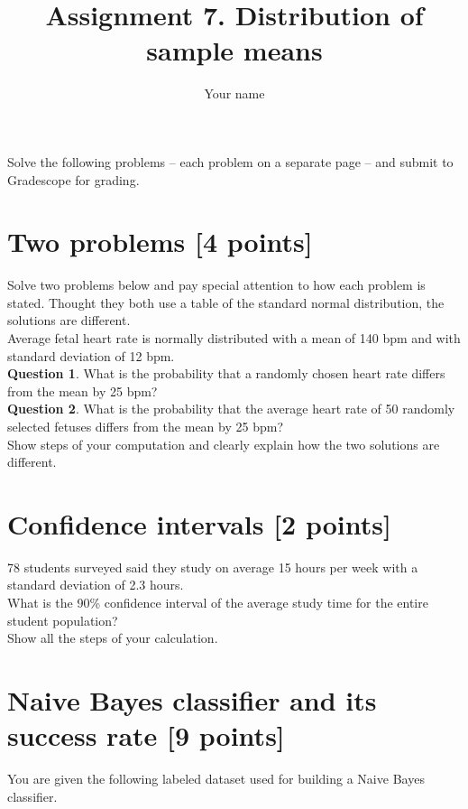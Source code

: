 \documentclass{article}
\title{Assignment 7. Distribution of sample means}
\author{Your name}
\begin{document}
\maketitle


Solve the following problems -- each problem on a separate page -- and submit to Gradescope for grading. 

\newpage
\section{Two problems [4 points]}
Solve two problems below and pay special attention to how each problem is stated. Thought they both use a table of the standard normal distribution, the solutions are different.\\

Average fetal heart rate is normally distributed with a mean of 140 bpm and with standard deviation of 12 bpm.\\ 

{\bf Question 1}. What is the probability that a randomly chosen heart rate differs from the mean by 25 bpm?\\

{\bf Question 2}. What is the probability that the average heart rate of 50 randomly selected fetuses differs from the mean by 25 bpm?\\


Show steps of your computation and clearly explain how the two solutions are different.

\newpage
\section{Confidence intervals [2 points]}
78 students surveyed said they study on average 15 hours per week with a standard deviation of 2.3 hours.\\ 

\noindent What is the 90\% confidence interval of the average study time for the entire student population?\\


Show all the steps of your calculation. 

\newpage
\section{Naive Bayes classifier and its success rate [9 points]}
You are given the following labeled dataset used for building a Naive Bayes classifier.\\
\end{document}
